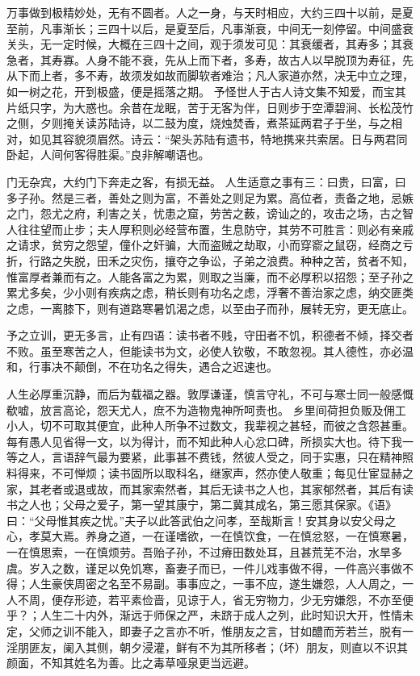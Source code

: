 \documentclass[letterpaper,10pt,english]{sphinxmanual}
\begin{document}
万事做到极精妙处，无有不圆者。人之一身，与天时相应，大约三四十以前，是夏至前，凡事渐长；三四十以后，是夏至后，凡事渐衰，中间无一刻停留。中间盛衰关头，无一定时候，大概在三四十之间，观于须发可见：其衰缓者，其寿多；其衰急者，其寿寡。人身不能不衰，先从上而下者，多寿，故古人以早脱顶为寿征，先从下而上者，多不寿，故须发如故而脚软者难治；凡人家道亦然，决无中立之理，如一树之花，开到极盛，便是摇落之期。
予怪世人于古人诗文集不知爱，而宝其片纸只字，为大惑也。余昔在龙眠，苦于无客为伴，日则步于空潭碧涧、长松茂竹之侧，夕则掩关读苏陆诗，以二鼓为度，烧烛焚香，煮茶延两君子于坐，与之相对，如见其容貌须眉然。诗云：“架头苏陆有遗书，特地携来共索居。日与两君同卧起，人间何客得胜渠。”良非解嘲语也。

门无杂宾，大约门下奔走之客，有损无益。
人生适意之事有三：曰贵，曰富，曰多子孙。然是三者，善处之则为富，不善处之则足为累。高位者，责备之地，忌嫉之门，怨尤之府，利害之关，忧患之窟，劳苦之薮，谤讪之的，攻击之场，古之智人往往望而止步；夫人厚积则必经营布置，生息防守，其劳不可胜言：则必有亲戚之请求，贫穷之怨望，僮仆之奸骗，大而盗贼之劫取，小而穿窬之鼠窃，经商之亏折，行路之失脱，田禾之灾伤，攘夺之争讼，子弟之浪费。种种之苦，贫者不知，惟富厚者兼而有之。人能各富之为累，则取之当廉，而不必厚积以招怨；至子孙之累尤多矣，少小则有疾病之虑，稍长则有功名之虑，浮奢不善治家之虑，纳交匪类之虑，一离膝下，则有道路寒暑饥渴之虑，以至由子而孙，展转无穷，更无底止。

予之立训，更无多言，止有四语：读书者不贱，守田者不饥，积德者不倾，择交者不败。虽至寒苦之人，但能读书为文，必使人钦敬，不敢忽视。其人德性，亦必温和，行事决不颠倒，不在功名之得失，遇合之迟速也。

人生必厚重沉静，而后为载福之器。敦厚谦谨，慎言守礼，不可与寒士同一般感慨欷嘘，放言高论，怨天尤人，庶不为造物鬼神所呵责也。
乡里间荷担负贩及佣工小人，切不可取其便宜，此种人所争不过数文，我辈视之甚轻，而彼之含怨甚重。每有愚人见省得一文，以为得计，而不知此种人心忿口碑，所损实大也。待下我一等之人，言语辞气最为要紧，此事甚不费钱，然彼人受之，同于实惠，只在精神照料得来，不可惮烦；读书固所以取科名，继家声，然亦使人敬重；每见仕宦显赫之家，其老者或退或故，而其家索然者，其后无读书之人也，其家郁然者，其后有读书之人也；父母之爱子，第一望其康宁，第二冀其成名，第三愿其保家。《语》曰：“父母惟其疾之忧。”夫子以此答武伯之问孝，至哉斯言！安其身以安父母之心，孝莫大焉。养身之道，一在谨嗜欲，一在慎饮食，一在慎忿怒，一在慎寒暑，一在慎思索，一在慎烦劳。吾贻子孙，不过瘠田数处耳，且甚荒芜不治，水旱多虞。岁入之数，谨足以免饥寒，畜妻子而已，一件儿戏事做不得，一件高兴事做不得；人生豪侠周密之名至不易副。事事应之，一事不应，遂生嫌怨，人人周之，一人不周，便存形迹，若平素俭啬，见谅于人，省无穷物力，少无穷嫌怨，不亦至便乎？；人生二十内外，渐远于师保之严，未跻于成人之列，此时知识大开，性情未定，父师之训不能入，即妻子之言亦不听，惟朋友之言，甘如醴而芳若兰，脱有一淫朋匪友，阑入其侧，朝夕浸灌，鲜有不为其所移者；（坏）朋友，则直以不识其颜面，不知其姓名为善。比之毒草哑泉更当远避。
\end{document}

